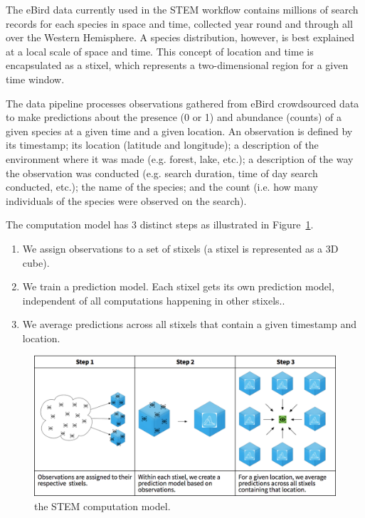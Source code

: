 \documentclass{acm_proc_article-sp}
\begin{document}
The eBird data currently used in the STEM workflow contains millions of search records for each species in space and time, collected year round and through all over the Western Hemisphere. A species distribution, however, is best explained at a local scale of space and time. This concept of location and time is encapsulated as a stixel, which represents a two-dimensional region for a given time window.

The data pipeline processes observations gathered from eBird crowdsourced data to make predictions about the presence (0 or 1) and abundance (counts) of a given species at a given time and a given location. An observation is defined by its timestamp; its location (latitude and longitude); a description of the environment where it was made (e.g. forest, lake, etc.); a description of the way the observation was conducted (e.g. search duration, time of day search conducted, etc.); the name of the species; and the count (i.e. how many individuals of the species were observed on the search).

The computation model has 3 distinct steps as illustrated in Figure~\ref{fig::computational-model}.

\begin{enumerate}[noitemsep, topsep=-5pt]
\item We assign observations to a set of stixels (a stixel is represented as a 3D cube).
\item We train a prediction model. Each stixel gets its own prediction model, independent of all computations happening in other stixels..  
\item We average predictions across all stixels that contain a given timestamp and location.
\end{enumerate}

\begin{figure}
    \includegraphics[width=\textwidth]{IMG/stem-computational-model.png}
    \caption{the STEM computation model.}
    \label{fig::computational-model}
  \end{figure}
\end{document}
